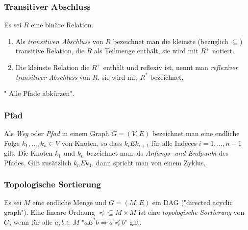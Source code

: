 \subsubsection{Transitiver Abschluss}
Es sei $R$ eine binäre Relation.
\begin{enumerate}
	\item Als \textit{transitiven Abschluss} von $R$ bezeichnet man die kleinste (bezüglich $\subseteq$) transitive Relation, die $R$ als Teilmenge enthält, sie wird mit $R^+$ notiert.
	\item Die kleinste Relation die $R^+$ enthält und reflexiv ist, nennt man \textit{reflexiver transitiver Abschluss} von $R$, sie wird mit $R^*$ bezeichnet.
\end{enumerate}

" Alle Pfade abkürzen".

\subsubsection{Pfad}
Als \textit{Weg} oder \textit{Pfad} in einem Graph $G=(V, E)$ bezeichnet man eine endliche Folge $k_1,\dots,k_n \in V$ von Knoten, so dass $k_iEk_{i+1}$ für alle Indeces $i=1,\dots,n-1$ gilt. Die Knoten $k_1$ und $k_n$ bezeichnet man als \textit{Anfangs- und Endpunkt} des Pfades. Gilt zusätzlich $k_nEk_1$, dann spricht man von einem Zyklus.

\subsubsection{Topologische Sortierung}
Es sei $M$ eine endliche Menge und $G = (M, E)$ ein DAG ("directed acyclic graph"). Eine lineare Ordnung $\preceq\subseteq M\times M$ ist eine \textit{topologische Sortierung} von $G$, wenn für alle $a, b \in M$ "$aE^*b \Rightarrow a \preceq b$" gilt.

